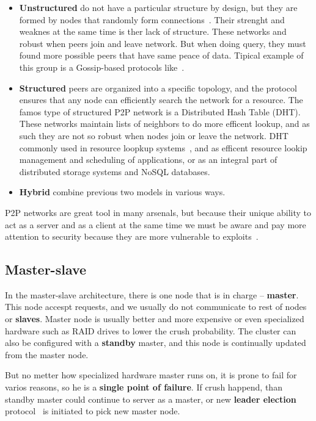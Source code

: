 \begin{itemize}
	\item \textbf{Unstructured} do not have a particular structure by design, but they are formed by nodes that randomly form connections~\cite{FilaliBHB11}. Their strenght and weaknes at the same time is ther lack of structure. These networks and robust when peers join and leave network. But when doing query, they must found more possible peers that have same peace of data. Tipical example of this group is a Gossip-based protocols like~\cite{DasGM02}.
	\item \textbf{Structured} peers are organized into a specific topology, and the protocol ensures that any node can efficiently search the network for a resource. The famos type of structured P2P network is a Distributed Hash Table (DHT). These networks maintain lists of neighbors to do more efficent lookup, and as such they are not so robust when nodes join or leave the network. DHT commonly used in resource loopkup systems~\cite{StoicaMKKB01}, and as efficent resource lookip management and scheduling of applications, or as an integral part of distributed storage systems and NoSQL\cite{Leavitt10} databases.
	\item \textbf{Hybrid} combine previous two models in various ways.
\end{itemize}

P2P networks are great tool in many arsenals, but because their unique ability to act as a server and as a client at the same time we must be aware and pay more attention to security because they are more vulnerable to exploits~\cite{0024003}.
%
%
\subsection{Master-slave}\label{sec:master_slave}
%
In the master-slave architecture, there is one node that is in charge -- \textbf{master}. This node accespt requests, and we usually do not communicate to rest of nodes or \textbf{slaves}. Master node is usually better and more expensive or even specialized hardware such as RAID drives to lower the crush probability. The cluster can also be configured with a \textbf{standby} master, and this node is continually updated from the master node.

But no metter how specialized hardware master runs on, it is prone to fail for varios reasons, so he is a \textbf{single point of failure}. If crush happend, than standby master could continue to server as a master, or new \textbf{leader election} protocol~\cite{KorachKM90} is initiated to pick new master node. 

